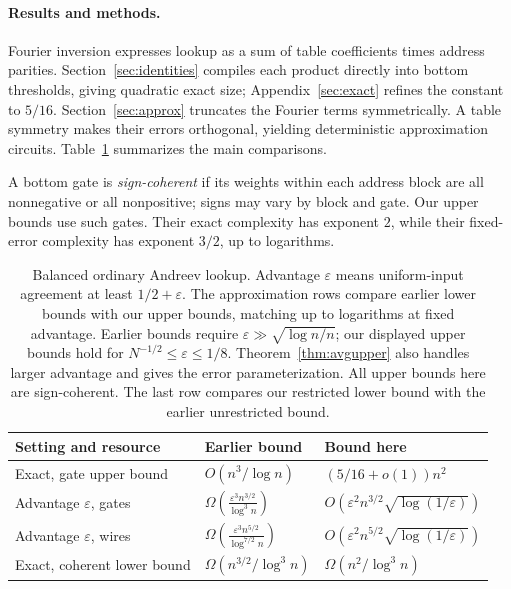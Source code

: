 \documentclass[11pt]{article}
\begin{document}
\paragraph{Results and methods.}
Fourier inversion expresses lookup as a sum of table coefficients times
address parities. Section~\ref{sec:identities} compiles each product directly
into bottom thresholds, giving quadratic exact size; Appendix~\ref{sec:exact}
refines the constant to $5/16$. Section~\ref{sec:approx} truncates the
Fourier terms symmetrically. A table symmetry makes their errors
orthogonal, yielding deterministic approximation circuits. Table~\ref{tab:bounds}
summarizes the main comparisons.

A bottom gate is \emph{sign-coherent} if its weights within each address
block are all nonnegative or all nonpositive; signs may vary by block and
gate. Our upper bounds use such gates. Their exact complexity has exponent
$2$, while their fixed-error complexity has exponent $3/2$, up to logarithms.

\begin{table}[t]
\centering
\small
\setlength{\tabcolsep}{4pt}
\renewcommand{\arraystretch}{1.25}
\begin{tabular}{@{}lll@{}}
\toprule
Setting and resource & Earlier bound~\cite{KW} & Bound here \\
\midrule
Exact, gate upper bound
 & $O(n^3/\log n)$ & $(5/16+o(1))n^2$ \\
Advantage $\varepsilon$, gates
 & $\Omega\!\left(\frac{\varepsilon^3n^{3/2}}{\log^3 n}\right)$
 & $O\!\left(\varepsilon^2n^{3/2}\sqrt{\log(1/\varepsilon)}\right)$ \\
Advantage $\varepsilon$, wires
 & $\Omega\!\left(\frac{\varepsilon^3n^{5/2}}{\log^{7/2}n}\right)$
 & $O\!\left(\varepsilon^2n^{5/2}\sqrt{\log(1/\varepsilon)}\right)$ \\
Exact, coherent lower bound
 & $\Omega(n^{3/2}/\log^3 n)$ & $\Omega(n^2/\log^3 n)$ \\
\bottomrule
\end{tabular}
\caption{Balanced ordinary Andreev lookup. Advantage $\varepsilon$ means
uniform-input agreement at least $1/2+\varepsilon$. The approximation rows
compare earlier lower bounds with our upper bounds, matching up to logarithms
at fixed advantage. Earlier bounds require $\varepsilon\gg\sqrt{\log n/n}$;
our displayed upper bounds hold for $N^{-1/2}\le\varepsilon\le1/8$.
Theorem~\ref{thm:avgupper} also handles larger advantage and gives the error
parameterization. All upper bounds here are sign-coherent. The last row
compares our restricted lower bound with the earlier unrestricted bound.}
\label{tab:bounds}
\end{table}
\end{document}
